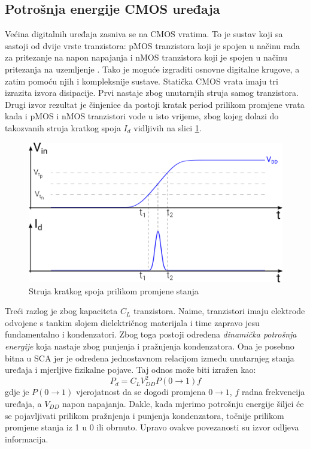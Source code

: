 \documentclass[times, utf8, diplomski]{fer}
\begin{document}
\subsection{Potrošnja energije CMOS uređaja} \label{sec:power_cmos}

Većina digitalnih uređaja zasniva se na CMOS vratima. To je sustav koji sa sastoji od dvije vrste tranzistora: pMOS tranzistora koji je spojen u načinu rada za pritezanje na napon napajanja  i nMOS tranzistora koji je spojen u načinu pritezanja na uzemljenje . Tako je moguće izgraditi osnovne digitalne krugove, a zatim pomoću njih i kompleksnije sustave. Statička CMOS vrata imaju tri izrazita izvora disipacije. Prvi nastaje zbog unutarnjih struja samog tranzistora. Drugi izvor rezultat je činjenice da postoji kratak period prilikom promjene vrata kada i pMOS i nMOS tranzistori vode u isto vrijeme, zbog kojeg dolazi do takozvanih struja kratkog spoja \(I_d\) vidljivih na slici \ref{fig:short_circuit_current}.

\begin{figure}[htb]
    \centering
    \includegraphics[width=12cm]{resources/images/SCA/short_circuit_current.png}
    \caption{Struja kratkog spoja prilikom promjene stanja}
    \label{fig:short_circuit_current}
\end{figure}

Treći razlog je zbog kapaciteta \(C_L\) tranzistora. Naime, tranzistori imaju elektrode odvojene s tankim slojem dielektričnog materijala i time zapravo jesu fundamentalno i kondenzatori. Zbog toga postoji određena \emph{dinamička potrošnja energije} koja nastaje zbog punjenja i pražnjenja kondenzatora. Ona je posebno bitna u SCA jer je određena jednostavnom relacijom između unutarnjeg stanja uređaja i mjerljive fizikalne pojave. Taj odnos može biti izražen kao:
\begin{equation}
    P_d = C_L V_{DD}^2 P(0 \rightarrow 1) f
\end{equation}
gdje je \(P(0 \rightarrow 1)\) vjerojatnost da se dogodi promjena \(0 \rightarrow 1\), \(f\) radna frekvencija uređaja, a \(V_{DD}\) napon napajanja. Dakle, kada mjerimo potrošnju energije šiljci će se pojavljivati prilikom pražnjenja i punjenja kondenzatora, točnije prilikom promjene stanja iz 1 u 0 ili obrnuto. Upravo ovakve povezanosti su izvor odljeva informacija.
\end{document}
